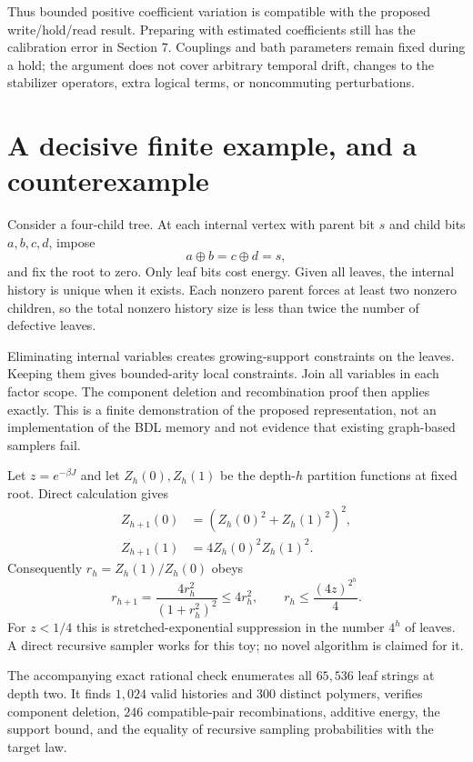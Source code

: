 \documentclass[11pt,a4paper]{article}
\begin{document}
Thus bounded positive coefficient variation is compatible with the proposed write/hold/read result. Preparing with estimated coefficients still has the calibration error in Section 7. Couplings and bath parameters remain fixed during a hold; the argument does not cover arbitrary temporal drift, changes to the stabilizer operators, extra logical terms, or noncommuting perturbations.

\section{A decisive finite example, and a counterexample}

Consider a four-child tree. At each internal vertex with parent bit $s$ and child bits $a,b,c,d$, impose
\begin{equation}
 a\oplus b=c\oplus d=s,
\end{equation}
and fix the root to zero. Only leaf bits cost energy. Given all leaves, the internal history is unique when it exists. Each nonzero parent forces at least two nonzero children, so the total nonzero history size is less than twice the number of defective leaves.

Eliminating internal variables creates growing-support constraints on the leaves. Keeping them gives bounded-arity local constraints. Join all variables in each factor scope. The component deletion and recombination proof then applies exactly. This is a finite demonstration of the proposed representation, not an implementation of the BDL memory and not evidence that existing graph-based samplers fail.

Let $z=e^{-\beta J}$ and let $Z_h(0),Z_h(1)$ be the depth-$h$ partition functions at fixed root. Direct calculation gives
\begin{align}
 Z_{h+1}(0)&=(Z_h(0)^2+Z_h(1)^2)^2,\\
 Z_{h+1}(1)&=4Z_h(0)^2Z_h(1)^2.
\end{align}
Consequently $r_h=Z_h(1)/Z_h(0)$ obeys
\begin{equation}
 r_{h+1}=\frac{4r_h^2}{(1+r_h^2)^2}\leq4r_h^2,
 \qquad r_h\leq\frac{(4z)^{2^h}}4.
\end{equation}
For $z<1/4$ this is stretched-exponential suppression in the number $4^h$ of leaves. A direct recursive sampler works for this toy; no novel algorithm is claimed for it.

The accompanying exact rational check enumerates all $65{,}536$ leaf strings at depth two. It finds $1{,}024$ valid histories and $300$ distinct polymers, verifies component deletion, $246$ compatible-pair recombinations, additive energy, the support bound, and the equality of recursive sampling probabilities with the target law.
\end{document}

